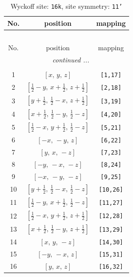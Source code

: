 \documentclass[fleqn,8pt]{jsarticle}
\begin{document}
\begin{longtable}{ccc}
\caption{Wyckoff site: {\tt 16k}, site symmetry: {\tt 11'}}
 \\
 \hline \hline
No. & position & mapping \\ \hline \endfirsthead

\multicolumn{2}{l}{\tablename\ \thetable{}} \\
 \hline \hline
No. & position & mapping \\ \hline \endhead

 \hline \hline
\multicolumn{2}{r}{\footnotesize\it continued ...} \\ \endfoot

 \hline \hline
\multicolumn{2}{r}{} \\ \endlastfoot

1 & $\left[ x,\, y,\, z \right]$ & {\tt [1,17]} \\ \hline
2 & $\left[ \frac{1}{2} - y,\, x + \frac{1}{2},\, z + \frac{1}{2} \right]$ & {\tt [2,18]} \\ \hline
3 & $\left[ y + \frac{1}{2},\, \frac{1}{2} - x,\, z + \frac{1}{2} \right]$ & {\tt [3,19]} \\ \hline
4 & $\left[ x + \frac{1}{2},\, \frac{1}{2} - y,\, \frac{1}{2} - z \right]$ & {\tt [4,20]} \\ \hline
5 & $\left[ \frac{1}{2} - x,\, y + \frac{1}{2},\, \frac{1}{2} - z \right]$ & {\tt [5,21]} \\ \hline
6 & $\left[ - x,\, - y,\, z \right]$ & {\tt [6,22]} \\ \hline
7 & $\left[ y,\, x,\, - z \right]$ & {\tt [7,23]} \\ \hline
8 & $\left[ - y,\, - x,\, - z \right]$ & {\tt [8,24]} \\ \hline
9 & $\left[ - x,\, - y,\, - z \right]$ & {\tt [9,25]} \\ \hline
10 & $\left[ y + \frac{1}{2},\, \frac{1}{2} - x,\, \frac{1}{2} - z \right]$ & {\tt [10,26]} \\ \hline
11 & $\left[ \frac{1}{2} - y,\, x + \frac{1}{2},\, \frac{1}{2} - z \right]$ & {\tt [11,27]} \\ \hline
12 & $\left[ \frac{1}{2} - x,\, y + \frac{1}{2},\, z + \frac{1}{2} \right]$ & {\tt [12,28]} \\ \hline
13 & $\left[ x + \frac{1}{2},\, \frac{1}{2} - y,\, z + \frac{1}{2} \right]$ & {\tt [13,29]} \\ \hline
14 & $\left[ x,\, y,\, - z \right]$ & {\tt [14,30]} \\ \hline
15 & $\left[ - y,\, - x,\, z \right]$ & {\tt [15,31]} \\ \hline
16 & $\left[ y,\, x,\, z \right]$ & {\tt [16,32]} \\
\end{longtable}
\end{document}

